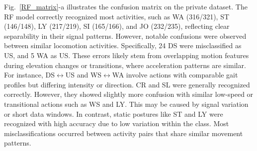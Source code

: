 \documentclass[journal,twoside,web]{ieeecolor}
\begin{document}
Fig.~\ref{RF_matrix}-a illustrates the confusion matrix on the private dataset. The RF model correctly recognized most activities, such as WA (316/321), ST (146/148), LY (217/219), SI (165/166), and JO (232/235), reflecting clear separability in their signal patterns. However, notable confusions were observed between similar locomotion activities. Specifically, 24 DS were misclassified as US, and 5 WA as US. These errors likely stem from overlapping motion features during elevation changes or transitions, where acceleration patterns are similar. For instance, DS$\leftrightarrow$US and WS$\leftrightarrow$WA involve actions with comparable gait profiles but differing intensity or direction. CR and SL were generally recognized correctly. However, they showed slightly more confusion with similar low-speed or transitional actions such as WS and LY. This may be caused by signal variation or short data windows. In contrast, static postures like ST and LY were recognized with high accuracy due to low variation within the class. Most misclassifications occurred between activity pairs that share similar movement patterns.
\end{document}

